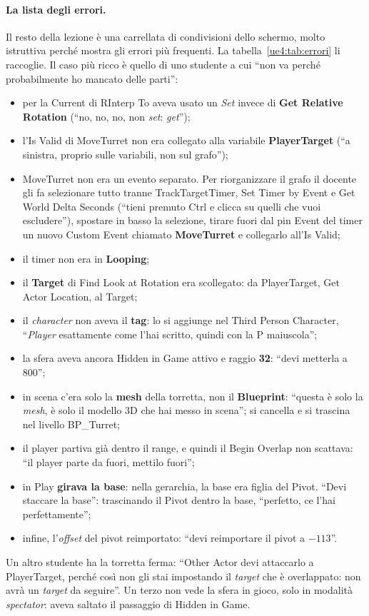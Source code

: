 \paragraph{La lista degli errori.} Il resto della lezione è una carrellata di
condivisioni dello schermo, molto istruttiva perché mostra gli errori più frequenti. La
tabella~\ref{ue4:tab:errori} li raccoglie. Il caso più ricco è quello di uno studente
a cui ``non va perché probabilmente ho mancato delle parti'':
\begin{itemize}
  \item per la Current di RInterp To aveva usato un \emph{Set} invece di \textbf{Get
        Relative Rotation} (``no, no, no, non \emph{set}: \emph{get}'');
  \item l'Is Valid di MoveTurret non era collegato alla variabile \textbf{PlayerTarget}
        (``a sinistra, proprio sulle variabili, non sul grafo'');
  \item MoveTurret non era un evento separato. Per riorganizzare il grafo il docente
        gli fa selezionare tutto tranne TrackTargetTimer, Set Timer by Event e Get
        World Delta Seconds (``tieni premuto Ctrl e clicca su quelli che vuoi
        escludere''), spostare in basso la selezione, tirare fuori dal pin Event del
        timer un nuovo Custom Event chiamato \textbf{MoveTurret} e collegarlo all'Is
        Valid;
  \item il timer non era in \textbf{Looping};
  \item il \textbf{Target} di Find Look at Rotation era scollegato: da PlayerTarget,
        Get Actor Location, al Target;
  \item il \emph{character} non aveva il \textbf{tag}: lo si aggiunge nel Third Person
        Character, ``\emph{Player} esattamente come l'hai scritto, quindi con la P
        maiuscola'';
  \item la sfera aveva ancora Hidden in Game attivo e raggio \textbf{32}: ``devi
        metterla a 800'';
  \item in scena c'era solo la \textbf{mesh} della torretta, non il
        \textbf{Blueprint}: ``questa è solo la \emph{mesh}, è solo il modello 3D che hai
        messo in scena''; si cancella e si trascina nel livello BP\_Turret;
  \item il player partiva già dentro il range, e quindi il Begin Overlap non scattava:
        ``il player parte da fuori, mettilo fuori'';
  \item in Play \textbf{girava la base}: nella gerarchia, la base era figlia del Pivot.
        ``Devi staccare la base'': trascinando il Pivot dentro la base, ``perfetto, ce
        l'hai perfettamente'';
  \item infine, l'\emph{offset} del pivot reimportato: ``devi reimportare il pivot a
        $-113$''.
\end{itemize}
Un altro studente ha la torretta ferma: ``Other Actor devi attaccarlo a PlayerTarget,
perché così non gli stai impostando il \emph{target} che è overlappato: non avrà un
\emph{target} da seguire''. Un terzo non vede la sfera in gioco, solo in modalità
\emph{spectator}: aveva saltato il passaggio di Hidden in Game.

